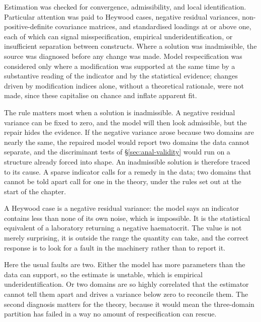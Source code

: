Estimation was checked for convergence, admissibility, and local identification. Particular attention was paid to Heywood cases, negative residual variances, non-positive-definite covariance matrices, and standardised loadings at or above one, each of which can signal misspecification, empirical underidentification, or insufficient separation between constructs. Where a solution was inadmissible, the source was diagnosed before any change was made. Model respecification was considered only where a modification was supported at the same time by a substantive reading of the indicator and by the statistical evidence; changes driven by modification indices alone, without a theoretical rationale, were not made, since these capitalise on chance and inflate apparent fit.

The rule matters most when a solution is inadmissible. A negative residual variance can be fixed to zero, and the model will then look admissible, but the repair hides the evidence. If the negative variance arose because two domains are nearly the same, the repaired model would report two domains the data cannot separate, and the discriminant tests of \S\ref{sec:anal-validity} would run on a structure already forced into shape. An inadmissible solution is therefore traced to its cause. A sparse indicator calls for a remedy in the data; two domains that cannot be told apart call for one in the theory, under the rules set out at the start of the chapter.

\medskip
{}

\begin{reading}
A Heywood case is a negative residual variance: the model says an indicator
contains less than none of its own noise, which is impossible. It is the
statistical equivalent of a laboratory returning a negative haematocrit. The
value is not merely surprising, it is outside the range the quantity can take,
and the correct response is to look for a fault in the machinery rather than to
report it.

Here the usual faults are two. Either the model has more parameters than the
data can support, so the estimate is unstable, which is empirical
underidentification. Or two domains are so highly correlated that the estimator
cannot tell them apart and drives a variance below zero to reconcile them. The
second diagnosis matters for the theory, because it would mean the three-domain
partition has failed in a way no amount of respecification can rescue.
\end{reading}

